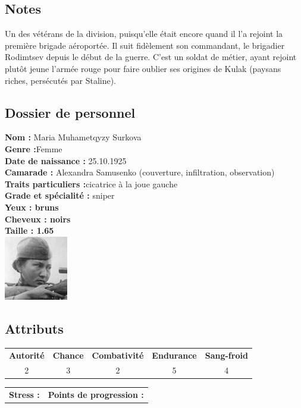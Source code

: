 \documentclass{report}
\begin{document}
\subsection*{Notes}
Un des vétérans de la division, puisqu'elle était encore quand il l'a rejoint la première brigade aéroportée. Il suit fidèlement son commandant, le brigadier Rodimtsev depuis le début de la guerre. C'est un soldat de métier, ayant rejoint plutôt jeune l'armée rouge pour faire oublier ses origines de Kulak (paysans riches, persécutés par Staline).
\newpage
\ttfamily
\begin{center}
\section*{Dossier de personnel}
\begin{multicols}{3}
\textbf{Nom :} Maria Muhametqyzy Surkova\\
\textbf{Genre :}Femme\\
\textbf{Date de naissance :} 25.10.1925\\
\textbf{Camarade :} Alexandra Samusenko (couverture, infiltration, observation)\\
\textbf{Traits particuliers :}cicatrice à la joue gauche\\
\columnbreak
\textbf{Grade et spécialité :} sniper\\
\textbf{Yeux : bruns}\\
\textbf{Cheveux : noirs}\\
\textbf{Taille : 1.65}\\
\columnbreak
\includegraphics[height=80pt]{Maria.jpg}
\end{multicols}
\end{center}
\noindent\makebox[\linewidth]{\rule{\textwidth}{0.4pt}}
\subsection*{Attributs}
\begin{center}
    \begin{tabular}{c|c|c|c|c}
        \textbf{Autorité} & \textbf{Chance} & \textbf{Combativité} & \textbf{Endurance} & \textbf{Sang-froid} \\
         2&3 &2 &5 &4\\

    \end{tabular}
\end{center}
\begin{tabular}{m{} m{}}
     \textbf{Stress :} & \textbf{Points de progression :}
\end{tabular}\\
\noindent\makebox[\linewidth]{\rule{\textwidth}{0.4pt}}
\end{document}
